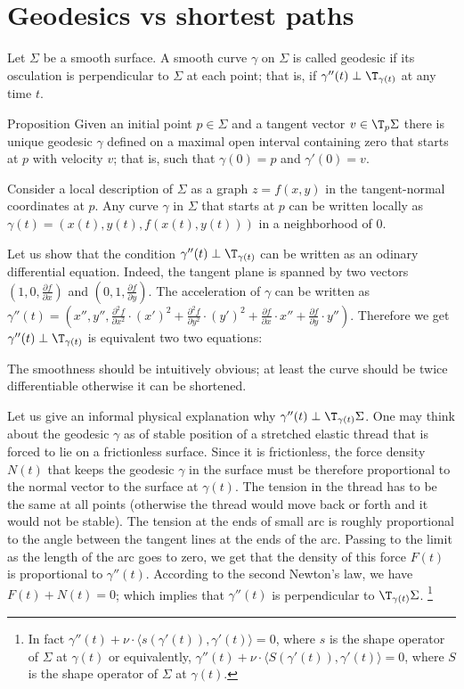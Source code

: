 \chapter{Geodesics vs shortest paths}

Let $\Sigma$ be a smooth surface.
A smooth curve $\gamma$ on $\Sigma$ is called geodesic if its osculation is perpendicular to $\Sigma$ at each point;
that is, if $\gamma''(t)\perp\T_{\gamma(t)}$ at any time $t$.

\begin{thm}{Proposition}
Given an initial point $p\in \Sigma$ and a tangent vector $v\in\T_p\Sigma$ there is unique geodesic $\gamma$ defined on a maximal open interval containing zero that starts at $p$ with velocity $v$; that is,
such that $\gamma(0)=p$ and $\gamma'(0)=v$.
\end{thm}

Consider a local description of $\Sigma$ as a graph $z=f(x,y)$ in the tangent-normal coordinates at $p$.
Any curve $\gamma$ in $\Sigma$ that starts at $p$ can be written locally as 
$\gamma(t)=(x(t),y(t),f(x(t),y(t)))$ in a neighborhood of $0$.

Let us show that the condition $\gamma''(t)\perp\T_{\gamma(t)}$ can be written as an odinary differential equation.
Indeed, the tangent plane is spanned by two vectors $(1,0,\tfrac{\partial f}{\partial x})$ and $(0,1,\tfrac{\partial f}{\partial y})$.
The acceleration of $\gamma$ can be written as $\gamma''(t)=(x'',y'',\tfrac{\partial^2 f}{\partial x^2}\cdot (x')^2+\tfrac{\partial^2 f}{\partial y^2}\cdot (y')^2+\tfrac{\partial f}{\partial x}\cdot x''+\tfrac{\partial f}{\partial y}\cdot y'')$.
Therefore we get $\gamma''(t)\perp\T_{\gamma(t)}$ is equivalent two two equations:




The smoothness should be intuitively obvious; at least the curve should be twice differentiable otherwise it can be shortened.

Let us give an informal physical explanation why $\gamma''(t)\perp\T_{\gamma(t)}\Sigma$.
One may think about the geodesic $\gamma$ as of stable position of a stretched elastic thread that is forced to lie on a frictionless surface.
Since it is frictionless, the force density $N(t)$ that keeps the geodesic $\gamma$ in the surface must be therefore proportional to the normal vector to the surface at $\gamma(t)$.
The tension in the thread has to be the same at all points (otherwise the thread would move back or forth and it would not be stable).
The tension at the ends of small arc is roughly proportional to the angle between the tangent lines at the ends of the arc. 
Passing to the limit as the length of the arc goes to zero, we get that the density of this force $F(t)$ is proportional to $\gamma''(t)$.
According to the second Newton's law, we have $F(t)+N(t)=0$;
which implies that  $\gamma''(t)$ is perpendicular to $\T_{\gamma(t)}\Sigma$.%
\footnote{In fact $\gamma''(t)+\nu\cdot \langle s(\gamma'(t)),\gamma'(t)\rangle=0$, where $s$ is the shape operator of $\Sigma$ at $\gamma(t)$ or equivalently,
$\gamma''(t)+\nu\cdot  \langle S(\gamma'(t)),\gamma'(t)\rangle=0$, where $S$ is the shape operator of $\Sigma$ at $\gamma(t)$.}

